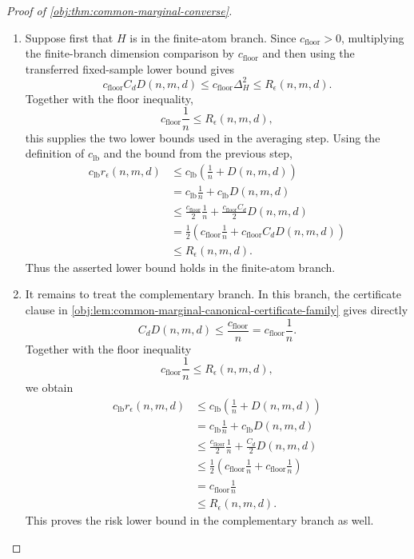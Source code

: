 \begin{proof}[Proof of \cref{obj:thm:common-marginal-converse}]
\begin{enumerate}
\item Suppose first that \(H\) is in the finite-atom branch.  Since \(c_{\mathrm{floor}}>0\), multiplying the finite-branch dimension comparison by \(c_{\mathrm{floor}}\) and then using the transferred fixed-sample lower bound gives
\[
c_{\mathrm{floor}}C_dD(n,m,d)
\le
c_{\mathrm{floor}}\Delta_H^2
\le
R_\epsilon(n,m,d).
\]
Together with the floor inequality,
\[
c_{\mathrm{floor}}\frac1n\le R_\epsilon(n,m,d),
\]
this supplies the two lower bounds used in the averaging step.  Using the definition of \(c_{\mathrm{lb}}\) and the bound from the previous step,
\[
\begin{aligned}
c_{\mathrm{lb}} r_\epsilon(n,m,d)
&\le
c_{\mathrm{lb}}\left(\frac1n+D(n,m,d)\right)\\
&=
c_{\mathrm{lb}}\frac1n+c_{\mathrm{lb}} D(n,m,d)\\
&\le
\frac{c_{\mathrm{floor}}}{2}\frac1n
+\frac{c_{\mathrm{floor}}C_d}{2}D(n,m,d)\\
&=
\frac12\left(
c_{\mathrm{floor}}\frac1n
+
c_{\mathrm{floor}}C_dD(n,m,d)
\right)\\
&\le R_\epsilon(n,m,d).
\end{aligned}
\]
Thus the asserted lower bound holds in the finite-atom branch. %

\item It remains to treat the complementary branch.  In this branch, the certificate clause in \cref{obj:lem:common-marginal-canonical-certificate-family} gives directly
\[
C_dD(n,m,d)
\le
\frac{c_{\mathrm{floor}}}{n}
=
c_{\mathrm{floor}}\frac1n.
\]
Together with the floor inequality
\[
c_{\mathrm{floor}}\frac1n\le R_\epsilon(n,m,d),
\]
we obtain
\[
\begin{aligned}
c_{\mathrm{lb}} r_\epsilon(n,m,d)
&\le
c_{\mathrm{lb}}\left(\frac1n+D(n,m,d)\right)\\
&=
c_{\mathrm{lb}}\frac1n+c_{\mathrm{lb}} D(n,m,d)\\
&\le
\frac{c_{\mathrm{floor}}}{2}\frac1n
+\frac{C_d}{2}D(n,m,d)\\
&\le
\frac12\left(
c_{\mathrm{floor}}\frac1n+
c_{\mathrm{floor}}\frac1n
\right)\\
&=
c_{\mathrm{floor}}\frac1n\\
&\le R_\epsilon(n,m,d).
\end{aligned}
\]
This proves the risk lower bound in the complementary branch as well. %


\end{enumerate}
\end{proof}
